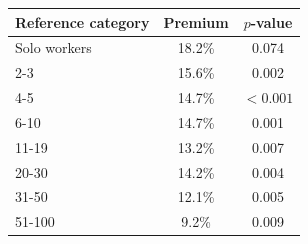 \begin{tabular}{lcc}
\toprule
    Reference category & Premium & $p$-value \\
    \midrule
Solo workers & 18.2\% & 0.074 \\
2-3 & 15.6\% & 0.002 \\
4-5 & 14.7\% & $<0.001$ \\
6-10 & 14.7\% & 0.001 \\
11-19 & 13.2\% & 0.007 \\
20-30 & 14.2\% & 0.004 \\
31-50 & 12.1\% & 0.005 \\
51-100 & 9.2\% & 0.009\\
\bottomrule\end{tabular}
